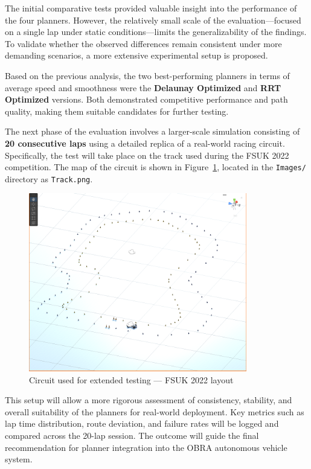 \documentclass[a4paper,11pt]{report}
\begin{document}
The initial comparative tests provided valuable insight into the performance of the four planners. However, the relatively small scale of the evaluation—focused on a single lap under static conditions—limits the generalizability of the findings. To validate whether the observed differences remain consistent under more demanding scenarios, a more extensive experimental setup is proposed.

Based on the previous analysis, the two best-performing planners in terms of average speed and smoothness were the \textbf{Delaunay Optimized} and \textbf{RRT Optimized} versions. Both demonstrated competitive performance and path quality, making them suitable candidates for further testing.

The next phase of the evaluation involves a larger-scale simulation consisting of \textbf{20 consecutive laps} using a detailed replica of a real-world racing circuit. Specifically, the test will take place on the track used during the FSUK 2022 competition. The map of the circuit is shown in Figure~\ref{fig:track}, located in the \texttt{Images/} directory as \texttt{Track.png}.

\begin{figure}[H]
    \centering
    \includegraphics[width=0.85\textwidth]{Images/Track.png}
    \caption{Circuit used for extended testing — FSUK 2022 layout}
    \label{fig:track}
\end{figure}

This setup will allow a more rigorous assessment of consistency, stability, and overall suitability of the planners for real-world deployment. Key metrics such as lap time distribution, route deviation, and failure rates will be logged and compared across the 20-lap session. The outcome will guide the final recommendation for planner integration into the OBRA autonomous vehicle system.
\end{document}
